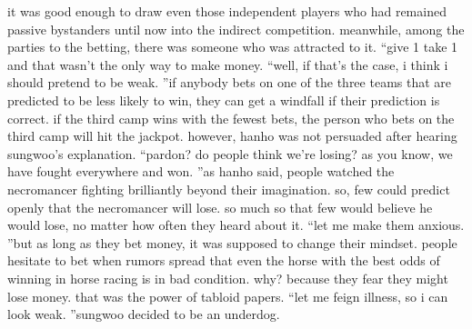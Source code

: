 it was good enough to draw even those independent players who had remained passive bystanders until now into the indirect competition.
meanwhile, among the parties to the betting, there was someone who was attracted to it.
“give 1%
take 1%
 and that wasn’t the only way to make money.
“well, if that’s the case, i think i should pretend to be weak.
”if anybody bets on one of the three teams that are predicted to be less likely to win, they can get a windfall if their prediction is correct.
 if the third camp wins with the fewest bets, the person who bets on the third camp will hit the jackpot.
however, hanho was not persuaded after hearing sungwoo’s explanation.
“pardon? do people think we’re losing? as you know, we have fought everywhere and won.
”as hanho said, people watched the necromancer fighting brilliantly beyond their imagination.
so, few could predict openly that the necromancer will lose.
so much so that few would believe he would lose, no matter how often they heard about it.
“let me make them anxious.
”but as long as they bet money, it was supposed to change their mindset.
 people hesitate to bet when rumors spread that even the horse with the best odds of winning in horse racing is in bad condition.
 why? because they fear they might lose money.
that was the power of tabloid papers.
“let me feign illness, so i can look weak.
”sungwoo decided to be an underdog.


 